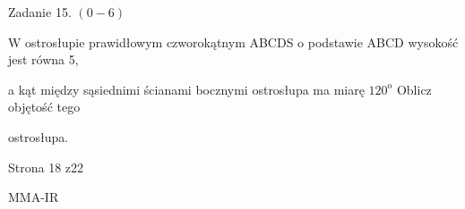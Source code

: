 \documentclass[a4paper,12pt]{article}
\begin{document}
Zadanie 15. $(0-6)$

$\mathrm{W}$ ostrosłupie prawidłowym czworokątnym ABCDS o podstawie ABCD wysokość jest równa 5,

a kąt między sąsiednimi ścianami bocznymi ostrosłupa ma miarę $120^{\mathrm{o}}$ Oblicz objętość tego

ostrosłupa.

Strona 18 z22

MMA-IR
\end{document}
